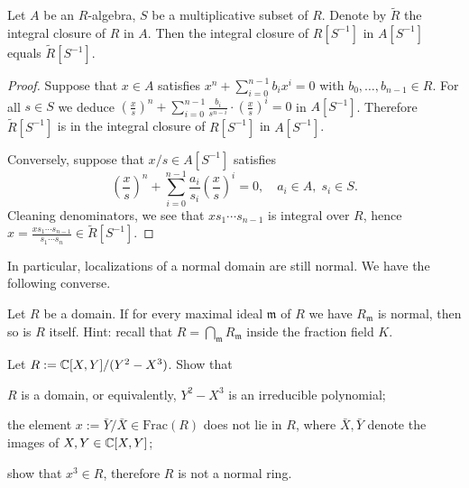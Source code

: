 \begin{lemma}
	Let $A$ be an $R$-algebra, $S$ be a multiplicative subset of $R$. Denote by $\tilde{R}$ the integral closure of $R$ in $A$. Then the integral closure of $R[S^{-1}]$ in $A[S^{-1}]$ equals $\tilde{R}[S^{-1}]$.
\end{lemma}
\begin{proof}
	Suppose that $x \in A$ satisfies $x^n + \sum_{i=0}^{n-1} b_i x^i = 0$ with $b_0, \ldots, b_{n-1} \in R$. For all $s \in S$ we deduce $\left(\frac{x}{s}\right)^n + \sum_{i=0}^{n-1} \frac{b_i}{s^{n-i}} \cdot \left( \frac{x}{s} \right)^i = 0$ in $A[S^{-1}]$. Therefore $\tilde{R}[S^{-1}]$ is in the integral closure of $R[S^{-1}]$ in $A[S^{-1}]$.

	Conversely, suppose that $x/s \in A[S^{-1}]$ satisfies
	\[ \left(\frac{x}{s}\right)^n + \sum_{i=0}^{n-1} \frac{a_i}{s_i} \left( \frac{x}{s} \right)^i = 0, \quad a_i \in A, \; s_i \in S. \]
	Cleaning denominators, we see that $x s_1 \cdots s_{n-1}$ is integral over $R$, hence $x = \frac{xs_1 \cdots s_{n-1}}{s_1 \cdots s_n} \in \tilde{R}[S^{-1}]$.
\end{proof}

In particular, localizations of a normal domain are still normal. We have the following converse.
\begin{exercise}
	Let $R$ be a domain. If for every maximal ideal $\mathfrak{m}$ of $R$ we have $R_{\mathfrak{m}}$ is normal, then so is $R$ itself. Hint: recall that $R = \bigcap_{\mathfrak{m}} R_{\mathfrak{m}}$ inside the fraction field $K$.
\end{exercise}

\begin{exercise}
	Let $R := \mathbb{C}[X,Y]/(Y^2-X^3)$. Show that
	\begin{compactenum}[(i)]
		\item $R$ is a domain, or equivalently, $Y^2 - X^3$ is an irreducible polynomial;
		\item the element $x := \bar{Y}/\bar{X} \in \text{Frac}(R)$ does not lie in $R$, where $\bar{X},\bar{Y}$ denote the images of $X,Y \in \mathbb{C}[X,Y]$;
		\item show that $x^3 \in R$, therefore $R$ is not a normal ring.
	\end{compactenum}
\end{exercise}

